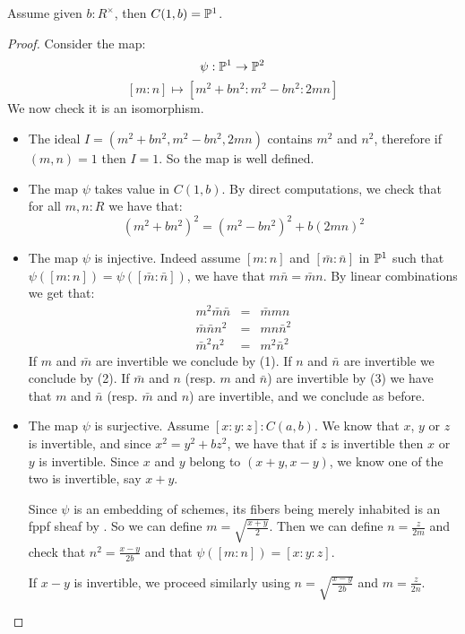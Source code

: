 \begin{lemma}\label{conic-one-split}
Assume given $b:R^\times$, then $C(1,b) = \mathbb{P}^1$.
\end{lemma}

\begin{proof}
Consider the map:
\[\psi:\mathbb{P}^1\to \mathbb{P}^2\]
\[ [m:n]\mapsto \left[m^2+bn^2 : m^2-bn^2 : 2mn\right] \]
We now check it is an isomorphism.
\begin{itemize}

\item The ideal $I = (m^2+bn^2, m^2-bn^2, 2mn)$ contains $m^2$ and $n^2$, therefore if $(m,n)=1$ then $I=1$. So the map is well defined.

\item The map $\psi$ takes value in $C(1,b)$. By direct computations, we check that for all $m,n:R$ we have that:
\[(m^2+bn^2)^2 = (m^2-bn^2)^2 + b(2mn)^2\]

\item The map $\psi$ is injective. Indeed assume $[m:n]$ and $[\bar{m}:\bar{n}]$ in $\mathbb{P}^1$ such that $\psi([m:n])=\psi([\bar{m}:\bar{n}])$, we have that $m\bar{n}=\bar{m}n$. By linear combinations we get that:
\begin{eqnarray}
m^2\bar{m}\bar{n} &=& \bar{m}mn\\
\bar{m}\bar{n}n^2 &=& mn\bar{n}^2\\
\bar{m}^2n^2 &=& m^2\bar{n}^2
\end{eqnarray}
If $m$ and $\bar{m}$ are invertible we conclude by (1). If $n$ and $\bar{n}$ are invertible we conclude by (2). If $\bar{m}$ and $n$ (resp. $m$ and $\bar{n}$) are invertible by (3) we have that $m$ and $\bar{n}$ (resp. $\bar{m}$ and $n$) are invertible, and we conclude as before.

\item The map $\psi$ is surjective. Assume $[x:y:z]:C(a,b)$. We know that $x$, $y$ or $z$ is invertible, and since $x^2=y^2+bz^2$, we have that if $z$ is invertible then $x$ or $y$ is invertible. Since $x$ and $y$ belong to $(x+y, x-y)$, we know one of the two is invertible, say $x+y$. 

Since $\psi$ is an embedding of schemes, its fibers being merely inhabited is an fppf sheaf by . So we can define $m=\sqrt{\frac{x+y}{2}}$. Then we can define $n=\frac{z}{2m}$ and check that $n^2 = \frac{x-y}{2b}$ and that $\psi([m:n]) = [x:y:z]$. 

If $x-y$ is invertible, we proceed similarly using $n=\sqrt{\frac{x-y}{2b}}$ and $m=\frac{z}{2n}$.
\end{itemize}
\end{proof}

